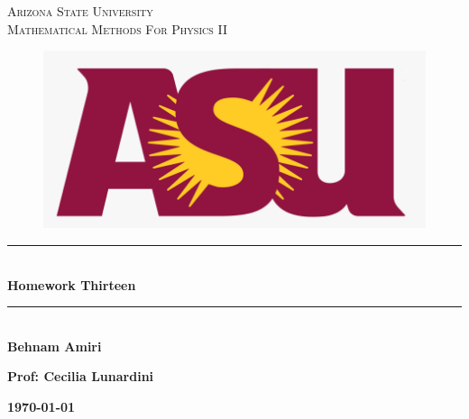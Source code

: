 \documentclass[fleqn]{article}
\begin{document}
  \begin{titlepage}

    \newcommand{\HRule}{\rule{\linewidth}{0.5mm}}

    \center


    \textsc{\LARGE Arizona State University}\\[1.5cm]

    \textsc{\LARGE Mathematical Methods For Physics II }\\[1.5cm]


    \begin{figure}
      \includegraphics[width=\linewidth]{asu.png}
    \end{figure}


    \HRule \\[0.4cm]
    { \huge \bfseries Homework Thirteen}\\[0.4cm] 
    \HRule \\[1.5cm]

    \textbf{Behnam Amiri}

    \bigbreak

    \textbf{Prof: Cecilia Lunardini}

    \bigbreak


    \textbf{{\large \today}\\[2cm]}

    \vfill

  \end{titlepage}
\end{document}
